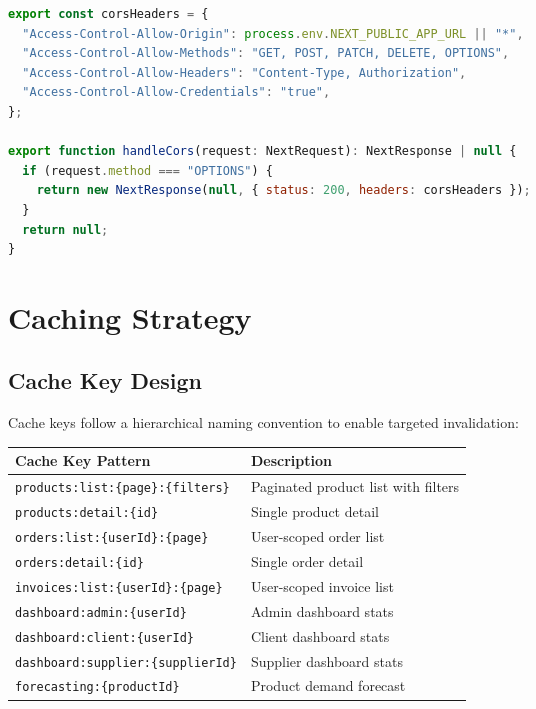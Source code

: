 \documentclass[12pt,a4paper]{report}
\begin{document}
\begin{lstlisting}[language=JavaScript,caption={CORS configuration in lib/api/cors.ts}]
export const corsHeaders = {
  "Access-Control-Allow-Origin": process.env.NEXT_PUBLIC_APP_URL || "*",
  "Access-Control-Allow-Methods": "GET, POST, PATCH, DELETE, OPTIONS",
  "Access-Control-Allow-Headers": "Content-Type, Authorization",
  "Access-Control-Allow-Credentials": "true",
};

export function handleCors(request: NextRequest): NextResponse | null {
  if (request.method === "OPTIONS") {
    return new NextResponse(null, { status: 200, headers: corsHeaders });
  }
  return null;
}
\end{lstlisting}

\section{Caching Strategy}

\subsection{Cache Key Design}

Cache keys follow a hierarchical naming convention to enable targeted invalidation:

\begin{center}
\begin{tabularx}{\textwidth}{lX}
  \toprule
  \textbf{Cache Key Pattern} & \textbf{Description} \\
  \midrule
  \texttt{products:list:\{page\}:\{filters\}} & Paginated product list with filters \\
  \texttt{products:detail:\{id\}} & Single product detail \\
  \texttt{orders:list:\{userId\}:\{page\}} & User-scoped order list \\
  \texttt{orders:detail:\{id\}} & Single order detail \\
  \texttt{invoices:list:\{userId\}:\{page\}} & User-scoped invoice list \\
  \texttt{dashboard:admin:\{userId\}} & Admin dashboard stats \\
  \texttt{dashboard:client:\{userId\}} & Client dashboard stats \\
  \texttt{dashboard:supplier:\{supplierId\}} & Supplier dashboard stats \\
  \texttt{forecasting:\{productId\}} & Product demand forecast \\
  \bottomrule
\end{tabularx}
\end{center}
\end{document}
